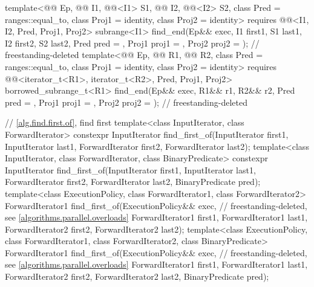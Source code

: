 \begin{codeblock}
{{    template<@@ Ep, @@ I1, @@<I1> S1,
             @@ I2, @@<I2> S2,
             class Pred = ranges::equal_to, class Proj1 = identity, class Proj2 = identity>
      requires @@<I1, I2, Pred, Proj1, Proj2>
      subrange<I1>
        find_end(Ep&& exec, I1 first1, S1 last1, I2 first2, S2 last2, Pred pred = {},
                 Proj1 proj1 = {}, Proj2 proj2 = {});           // freestanding-deleted
    template<@@ Ep, @@ R1, @@ R2,
             class Pred = ranges::equal_to, class Proj1 = identity, class Proj2 = identity>
      requires @@<iterator_t<R1>, iterator_t<R2>, Pred, Proj1, Proj2>
      borrowed_subrange_t<R1>
        find_end(Ep&& exec, R1&& r1, R2&& r2, Pred pred = {},
                 Proj1 proj1 = {}, Proj2 proj2 = {});           // freestanding-deleted
  }

  // \ref{alg.find.first.of}, find first
  template<class InputIterator, class ForwardIterator>
    constexpr InputIterator
      find_first_of(InputIterator first1, InputIterator last1,
                    ForwardIterator first2, ForwardIterator last2);
  template<class InputIterator, class ForwardIterator, class BinaryPredicate>
    constexpr InputIterator
      find_first_of(InputIterator first1, InputIterator last1,
                    ForwardIterator first2, ForwardIterator last2,
                    BinaryPredicate pred);
  template<class ExecutionPolicy, class ForwardIterator1, class ForwardIterator2>
    ForwardIterator1
      find_first_of(ExecutionPolicy&& exec,                     // freestanding-deleted, see \ref{algorithms.parallel.overloads}
                    ForwardIterator1 first1, ForwardIterator1 last1,
                    ForwardIterator2 first2, ForwardIterator2 last2);
  template<class ExecutionPolicy, class ForwardIterator1,
           class ForwardIterator2, class BinaryPredicate>
    ForwardIterator1
      find_first_of(ExecutionPolicy&& exec,                     // freestanding-deleted, see \ref{algorithms.parallel.overloads}
                    ForwardIterator1 first1, ForwardIterator1 last1,
                    ForwardIterator2 first2, ForwardIterator2 last2,
                    BinaryPredicate pred);

}
\end{codeblock}
